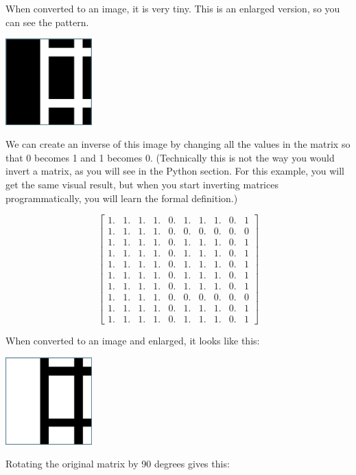 When converted to an image, it is very tiny. This is an enlarged version, so 
you can see the pattern.

\includegraphics[width=0.25\textwidth]{normal.png}

We can create an inverse of this image by changing all the values in the matrix 
so that 0 becomes 1 and 1 becomes 0. (Technically this is not the way you would 
invert a matrix, as you will see in the Python section. For this example, you 
will get the same visual result, but when you start inverting matrices 
programmatically, you will learn the formal definition.)

$$\begin{bmatrix}
1. & 1. & 1. & 1. & 0. & 1. & 1. & 1. & 0. & 1\\
1. & 1. & 1. & 1. & 0. & 0. & 0. & 0. & 0. & 0\\
1. & 1. & 1. & 1. & 0. & 1. & 1. & 1. & 0. & 1\\
1. & 1. & 1. & 1. & 0. & 1. & 1. & 1. & 0. & 1\\
1. & 1. & 1. & 1. & 0. & 1. & 1. & 1. & 0. & 1\\
1. & 1. & 1. & 1. & 0. & 1. & 1. & 1. & 0. & 1\\
1. & 1. & 1. & 1. & 0. & 1. & 1. & 1. & 0. & 1\\
1. & 1. & 1. & 1. & 0. & 0. & 0. & 0. & 0. & 0\\
1. & 1. & 1. & 1. & 0. & 1. & 1. & 1. & 0. & 1\\
1. & 1. & 1. & 1. & 0. & 1. & 1. & 1. & 0. & 1
\end{bmatrix}$$

When converted to an image and enlarged, it looks like this:

\includegraphics[width=0.25\textwidth]{inverse.png}

Rotating the original matrix by 90 degrees gives this:

